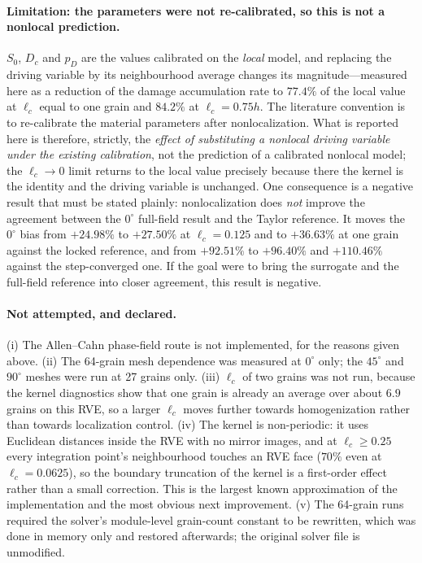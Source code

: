 \documentclass[11pt,a4paper,twocolumn]{article}
\providecommand{\ang}[1]{\ensuremath{#1^{\circ}}}
\begin{document}
\paragraph{Limitation: the parameters were not re-calibrated, so this is not a nonlocal prediction.} $S_0$,
$D_c$ and $p_D$ are the values calibrated on the \emph{local} model, and replacing the driving variable by its
neighbourhood average changes its magnitude---measured here as a reduction of the damage accumulation rate to
$77.4\%$ of the local value at $\ell_c$ equal to one grain and $84.2\%$ at $\ell_c = 0.75h$. The literature
convention is to re-calibrate the material parameters after nonlocalization. What is reported here is therefore,
strictly, the \emph{effect of substituting a nonlocal driving variable under the existing calibration}, not the
prediction of a calibrated nonlocal model; the $\ell_c \to 0$ limit returns to the local value precisely because
there the kernel is the identity and the driving variable is unchanged. One consequence is a negative result
that must be stated plainly: nonlocalization does \emph{not} improve the agreement between the $\ang{0}$
full-field result and the Taylor reference. It moves the $\ang{0}$ bias from $+24.98\%$ to $+27.50\%$ at
$\ell_c = 0.125$ and to $+36.63\%$ at one grain against the locked reference, and from $+92.51\%$ to $+96.40\%$
and $+110.46\%$ against the step-converged one. If the goal were to bring the surrogate and the full-field
reference into closer agreement, this result is negative.

\paragraph{Not attempted, and declared.} (i) The Allen--Cahn phase-field route is not implemented, for the
reasons given above. (ii) The 64-grain mesh dependence was measured at $\ang{0}$ only; the $\ang{45}$ and
$\ang{90}$ meshes were run at 27 grains only. (iii) $\ell_c$ of two grains was not run, because the kernel
diagnostics show that one grain is already an average over about $6.9$ grains on this RVE, so a larger $\ell_c$
moves further towards homogenization rather than towards localization control. (iv) The kernel is non-periodic:
it uses Euclidean distances inside the RVE with no mirror images, and at $\ell_c \ge 0.25$ every integration
point's neighbourhood touches an RVE face ($70\%$ even at $\ell_c = 0.0625$), so the boundary truncation of the
kernel is a first-order effect rather than a small correction. This is the largest known approximation of the
implementation and the most obvious next improvement. (v) The 64-grain runs required the solver's module-level
grain-count constant to be rewritten, which was done in memory only and restored afterwards; the original
solver file is unmodified.
\end{document}
